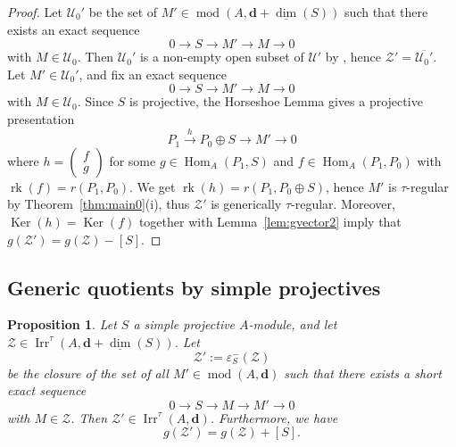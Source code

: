 \documentclass[12pt,reqno]{amsart}
\newtheorem{Prop}[Thm]{Proposition}
\theoremstyle{definition}
\newcommand{\bd}{\mathbf{d}}
\newcommand{\rk}{\operatorname{rk}}
\newcommand{\md}{\operatorname{mod}}
\newcommand{\dimv}{\underline{\dim}}
\newcommand{\Hom}{\operatorname{Hom}}
\newcommand{\Ker}{\operatorname{Ker}}
\newcommand{\irr}{\operatorname{Irr}}
\newcommand{\bbm}{\begin{matrix}}
\newcommand{\ebm}{\end{matrix}}
\newcommand{\calU}{\mathcal{U}}
\newcommand{\calZ}{\mathcal{Z}}
\begin{document}
\begin{proof}
Let $\calU_0'$ be the set of $M' \in \md(A,\bd + \dimv(S))$ such that there exists an exact sequence
$$
0 \to S \to M' \to M \to 0
$$
with $M \in \calU_0$.
Then $\calU_0'$ is a non-empty open subset of $\calU'$ by \cite[Theorem~1.3(iii)]{CBS02},
hence $\calZ' = \overline{\calU_0'}$.
Let $M' \in \calU_0'$, and fix an exact sequence
$$
0 \to S \to M' \to M \to 0
$$
with $M \in \calU_0$.
Since $S$ is projective,
the Horseshoe Lemma gives
a projective presentation
$$
P_1 \xrightarrow{h}
P_0 \oplus S \to M' \to 0
$$
where
$h = \left(\bbm
f \\ g
\ebm\right)
$
for some $g \in \Hom_A (P_1,S)$ and
$f \in \Hom_A(P_1,P_0)$ with $\rk(f)= r(P_1,P_0)$.
We get
$\rk(h) = r(P_1,P_0 \oplus S)$,
hence $M'$ is $\tau$-regular by Theorem~\ref{thm:main0}(i), thus
$\calZ'$ is
generically $\tau$-regular.
Moreover, $\Ker(h) = \Ker(f)$ together with Lemma~\ref{lem:gvector2} imply that
$g(\calZ') = g(\calZ) - [S]$.
\end{proof}



\subsection{Generic quotients by simple projectives}

\begin{Prop} \label{prop:quotient}
Let $S$ a simple projective $A$-module, and let
$\calZ \in \irr^\tau(A,\bd+\dimv(S))$.
Let
$$
\calZ' := \varepsilon_S^-(\calZ)
$$
be the closure of the set of all $M' \in \md(A,\bd)$ such that there exists a short exact sequence
$$
0 \to S \to M \to M' \to 0
$$
with $M \in \calZ$.
Then $\calZ' \in \irr^\tau(A,\bd)$.
Furthermore, we have
$$
g(\calZ') = g(\calZ) + [S].
$$
\end{Prop}
\end{document}

